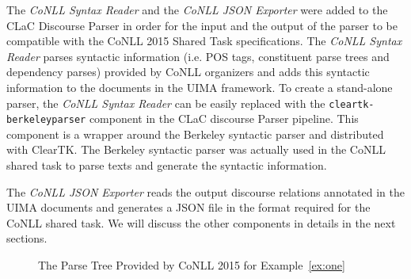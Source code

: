 \documentclass[11pt]{article}
\begin{document}
The \textit{CoNLL Syntax Reader} and the \textit{CoNLL JSON Exporter} were added to the CLaC Discourse Parser in order for the input and the output of the parser to be compatible with the CoNLL 2015 Shared Task specifications. The \textit{CoNLL Syntax Reader} parses syntactic information (i.e. POS tags, constituent parse trees and dependency parses) provided by CoNLL organizers and adds this syntactic information to the documents in the UIMA framework. To create a stand-alone parser, the \textit{CoNLL Syntax Reader} can be easily replaced with the \texttt{cleartk-berkeleyparser} component in the CLaC discourse Parser pipeline. This component is a wrapper around the Berkeley syntactic parser \cite{petrov07}  and distributed with ClearTK. The Berkeley syntactic parser was actually used in the CoNLL shared task to parse texts and generate the syntactic information.

The \textit{CoNLL JSON Exporter} reads the output discourse relations annotated in the UIMA documents and generates a JSON file in the format required for the CoNLL shared task. We will discuss the other components in details in the next sections. 


\begin{figure}[!htb]
\centering

\caption{The Parse Tree Provided by CoNLL 2015 for Example~\ref{ex:one} }
\label{fig:example}
\end{figure}
\end{document}
